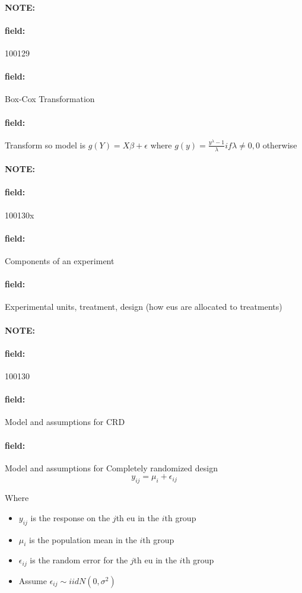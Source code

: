 \documentclass[12pt]{article}
\newenvironment{note}{\paragraph{NOTE:}}{}
\newenvironment{field}{\paragraph{field:}}{}
\begin{document}
\begin{note} \begin{field} \tiny 100129 \end{field}
 \begin{field}
  Box-Cox Transformation
 \end{field}
 \begin{field}
  Transform so model is $g(Y) = X\beta + \epsilon$
  where $g(y) = \frac{y^\lambda -1}{\lambda} if \lambda \neq 0, 0 $ otherwise
 \end{field}
\end{note}




\begin{note}
 \begin{field}
  \tiny 100130x
 \end{field}
 \begin{field}
  Components of an experiment
 \end{field}
 \begin{field}
  Experimental units, treatment, design (how eus are allocated to treatments)
 \end{field}
\end{note}



\begin{note}
 \begin{field}
  \tiny 100130
 \end{field}
 \begin{field}
  Model and assumptions for CRD
 \end{field}
 \begin{field}
  Model and assumptions for Completely randomized design
  $$y_{ij} = \mu_i + \epsilon_{ij}$$

  Where
  \begin{itemize}
   \item $y_{ij}$ is the response on the $j$th eu in the $i$th group
   \item $\mu_i$ is the population mean in the $i$th group
   \item $\epsilon_{ij}$ is the random error for the $j$th eu in the $i$th group
   \item Assume $\epsilon_{ij} \sim iid N(0,\sigma^2)$
  \end{itemize}
 \end{field}
\end{note}
\end{document}
